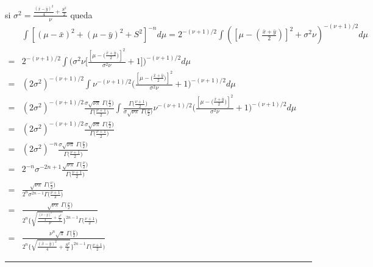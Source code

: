 \documentclass[12pt,]{article}
\begin{document}
si \(\sigma^2=\frac{\frac{(\bar{x}-\bar{y})^2}{4}+\frac{S^2}{2}}{\nu}\)
queda \[
\begin{array}{rl}
& \displaystyle \int[(\mu-\bar{x})^2+(\mu-\bar{y})^2+S^2]^{-n}d\mu=2^{-(\nu+1)/2}\displaystyle \int\left( [\mu- \left(\frac{\bar{x}+\bar{y}}{2}\right)]^2+\sigma^2\nu\right)^{-(\nu+1)/2}d\mu\\
=&2^{-(\nu+1)/2}\displaystyle \int\bigg( \sigma^2\nu\bigg[ \frac{[\mu- \big(\frac{\bar{x}+\bar{y}}{2}\big)]^2}{\sigma^2\nu}+1\bigg]\bigg)^{-(\nu+1)/2}d\mu\\
=&(2\sigma^2)^{-(\nu+1)/2}\displaystyle \int\nu^{-(\nu+1)/2}\bigg( \frac{[\mu- \big(\frac{\bar{x}+\bar{y}}{2}\big)]^2}{\sigma^2\nu}+1\bigg)^{-(\nu+1)/2}d\mu\\
=&(2\sigma^2)^{-(\nu+1)/2}\frac{\sigma\sqrt{\nu\pi}\ \Gamma\big(\frac{\nu}{2}\big)}{\Gamma\bigg(\frac{\nu+1}{2}\bigg)} \displaystyle \int \frac{\Gamma\bigg(\frac{\nu+1}{2}\bigg)}{\sigma\sqrt{\nu\pi}\ \Gamma\big(\frac{\nu}{2}\big)}\nu^{-(\nu+1)/2}\bigg( \frac{[\mu- \big(\frac{\bar{x}+\bar{y}}{2}\big)]^2}{\sigma^2\nu}+1\bigg)^{-(\nu+1)/2}d\mu\\
=&(2\sigma^2)^{-(\nu+1)/2}\frac{\sigma\sqrt{\nu\pi}\ \Gamma\big(\frac{\nu}{2}\big)}{\Gamma\bigg(\frac{\nu+1}{2}\bigg)} \\
=&(2\sigma^2)^{-n}\frac{\sigma\sqrt{\nu\pi}\ \Gamma\big(\frac{\nu}{2}\big)}{\Gamma\bigg(\frac{\nu+1}{2}\bigg)} \\
=&2^{-n}\sigma^{-2n+1}\frac{\sqrt{\nu\pi}\ \Gamma\big(\frac{\nu}{2}\big)}{\Gamma\bigg(\frac{\nu+1}{2}\bigg)} \\
=&\displaystyle\frac{\sqrt{\nu\pi}\ \Gamma\big(\frac{\nu}{2}\big)}{2^{n}\sigma^{2n-1}\Gamma\bigg(\frac{\nu+1}{2}\bigg)} \\
=&\displaystyle\frac{\sqrt{\nu\pi}\ \Gamma\big(\frac{\nu}{2}\big)}{2^{n}\Bigg\{\sqrt{\frac{\frac{(\bar{x}-\bar{y})^2}{4}+\frac{S^2}{2}}{\nu}}   \Bigg\}^{2n-1}\Gamma\bigg(\frac{\nu+1}{2}\bigg)} \\
=&\displaystyle \frac{\nu^n \sqrt{\pi}\ \Gamma\big(\frac{\nu}{2}\big)}{2^{n}\Bigg\{\sqrt{\frac{(\bar{x}-\bar{y})^2}{4}+\frac{S^2}{2}}   \Bigg\}^{2n-1}\Gamma\bigg(\frac{\nu+1}{2}\bigg)} 
\end{array}
\]

\begin{center}\rule{0.5\linewidth}{\linethickness}\end{center}
\end{document}
